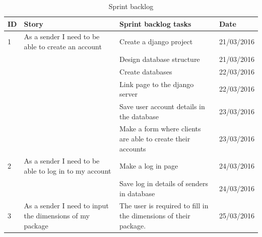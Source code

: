 \documentclass[paper=a4, fontsize=11pt]{scrartcl} %
\numberwithin{equation}{section} %
\numberwithin{figure}{section} %
\numberwithin{table}{section} %
\begin{document}
\begin{table}[!hbt]
\centering
\caption{Sprint backlog}
\label{SprintBacklogTableFirst}
\begin{tabular}{|p{1cm}|p{5cm}|p{5cm}|p{2cm}|}
\hline
\textbf{ID} & \textbf{Story}                                                                  & \textbf{Sprint backlog tasks}                                                                      & \textbf{Date} \\ \hline
1           & As a sender I need to be able to create an account                              & Create a django project                                                                            & 21/03/2016    \\ \hline
            &                                                                                 & Design database structure                                                                          & 21/03/2016    \\ \hline
            &                                                                                 & Create databases                                                                                   & 22/03/2016    \\ \hline
            &                                                                                 & Link page to the django server                                                                     & 22/03/2016    \\ \hline
            &                                                                                 & Save user account details in the database                                                          & 23/03/2016    \\ \hline
            &                                                                                 & Make a form where clients are able to create their accounts                                        & 23/03/2016    \\ \hline
2           & As a sender I need to be able to log in to my account                           & Make a log in page                                                                                 & 24/03/2016    \\ \hline
            &                                                                                 & Save log in details of senders in database                                                         & 24/03/2016    \\ \hline
3           & As a sender I need to input the dimensions of my package                        & The user is required to fill in the dimensions of their package. & 25/03/2016    \\ \hline

\end{tabular}
\end{table}
\end{document}
